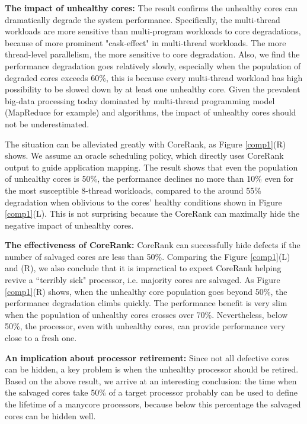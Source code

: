 \textbf{The impact of unhealthy cores:} The result confirms the unhealthy cores can dramatically degrade the system performance.  Specifically, the multi-thread workloads are more sensitive than multi-program workloads to core degradations, because of  more prominent "cask-effect" in multi-thread workloads. The more thread-level parallelism, the more sensitive to core degradation. Also, we find the performance degradation goes relatively slowly, especially when the population of degraded cores exceeds 60\%, this is because  every multi-thread workload has  high possibility to be slowed down by at least one unhealthy core. Given the prevalent big-data processing today dominated by multi-thread programming model (MapReduce for example) and algorithms, the impact of unhealthy cores should not be underestimated.

The situation can be alleviated greatly with CoreRank, as Figure \ref{comp1}(R) shows. We assume an oracle scheduling policy, which directly uses CoreRank output to guide application mapping. The result shows that even the population of unhealthy cores is 50\%, the performance declines no more than 10\% even for the most susceptible 8-thread workloads, compared to the around 55\% degradation when oblivious to the cores' healthy conditions shown in Figure \ref{comp1}(L).  This is not surprising because the CoreRank can maximally hide the negative impact of unhealthy cores.

\textbf{The effectiveness of CoreRank:} CoreRank can successfully hide defects if the number of salvaged cores are less than 50\%. Comparing the Figure \ref{comp1}(L) and (R), we also conclude that it is  impractical to expect CoreRank helping revive a ``terribly sick" processor, i.e.  majority cores are salvaged.    As Figure \ref{comp1}(R) shows, when the unhealthy core population goes beyond 50\%, the performance degradation climbs quickly. The performance benefit is very slim  when the population of unhealthy cores crosses over 70\%.  Nevertheless, below 50\%, the processor, even with unhealthy cores,  can provide performance very close to a fresh one.

\textbf{An implication about processor retirement: } Since not all defective cores can be hidden, a key problem is when the unhealthy processor should be retired.  Based on the above result, we arrive at an interesting conclusion: the time when the salvaged cores take 50\% of a target processor probably can be used to define the lifetime of a manycore processors, because below this percentage the salvaged  cores can be hidden well.

